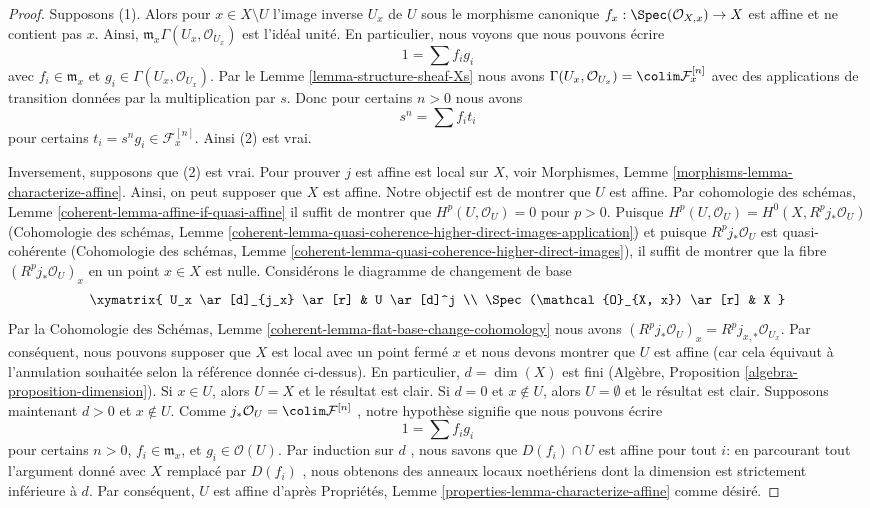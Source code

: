 \begin{proof}
Supposons (1). Alors pour  $x \in X \setminus U$  l'image inverse  $U_x$  de
 $U$  sous le morphisme canonique  $f_x : \Spec(\mathcal{O}_{X, x}) \to X$  est affine et ne contient
pas  $x$. Ainsi,  $\mathfrak m_x \Gamma(U_x, \mathcal{O}_{U_x})$  est l'idéal unité. En particulier, nous
voyons que nous pouvons écrire
$$
1 = \sum f_i g_i
$$
avec  $f_i \in \mathfrak m_x$  et  $g_i \in \Gamma(U_x, \mathcal{O}_{U_x})$. Par le Lemme  \ref{lemma-structure-sheaf-Xs}  nous avons
 $\Gamma(U_x, \mathcal{O}_{U_x}) = \colim \mathcal{F}^{[n]}_x$  avec des applications de transition données par la multiplication par
 $s$. Donc pour certains  $n > 0$  nous avons
$$
s^n = \sum f_i t_i
$$
pour certains  $t_i = s^ng_i \in \mathcal{F}^{[n]}_x$. Ainsi (2) est vrai.

\medskip\noindent
Inversement, supposons que (2) est vrai. Pour prouver  $j$  est affine est
local sur  $X$, voir Morphismes, Lemme  \ref{morphisms-lemma-characterize-affine}. Ainsi, on peut
supposer que  $X$  est affine. Notre objectif est de montrer que
 $U$  est affine. Par cohomologie des schémas, Lemme  \ref{coherent-lemma-affine-if-quasi-affine}  il suffit
de montrer que  $H^p(U, \mathcal{O}_U) = 0$  pour  $p > 0$. Puisque  $H^p(U, \mathcal{O}_U) = H^0(X, R^pj_*\mathcal{O}_U)$  (Cohomologie
des schémas, Lemme  \ref{coherent-lemma-quasi-coherence-higher-direct-images-application}) et puisque  $R^pj_*\mathcal{O}_U$  est quasi-cohérente
(Cohomologie des schémas, Lemme  \ref{coherent-lemma-quasi-coherence-higher-direct-images}), il suffit de montrer que la fibre
 $(R^pj_*\mathcal{O}_U)_x$  en un point  $x \in X$  est nulle. Considérons le diagramme de
changement de base
$$
\xymatrix{
U_x \ar[d]_{j_x} \ar[r] & U \ar[d]^j \\
\Spec(\mathcal{O}_{X, x}) \ar[r] & X
}
$$
Par la Cohomologie des Schémas, Lemme  \ref{coherent-lemma-flat-base-change-cohomology}  nous avons  $(R^pj_*\mathcal{O}_U)_x = R^pj_{x, *}\mathcal{O}_{U_x}$. Par
conséquent, nous pouvons supposer que  $X$  est local avec un point fermé
 $x$  et nous devons montrer que  $U$  est affine (car cela équivaut
à l'annulation souhaitée selon la référence donnée ci-dessus). En particulier,
 $d = \dim(X)$  est fini (Algèbre, Proposition  \ref{algebra-proposition-dimension}). Si  $x \in U$, alors
 $U = X$  et le résultat est clair. Si  $d = 0$  et  $x \not \in U$, alors
 $U = \emptyset$  et le résultat est clair. Supposons maintenant  $d > 0$  et
 $x \not \in U$. Comme  $j_*\mathcal{O}_U = \colim \mathcal{F}^{[n]}$ , notre hypothèse signifie que nous pouvons écrire
$$
1 = \sum f_i g_i
$$
pour certains  $n > 0$,  $f_i \in \mathfrak m_x$, et  $g_i \in \mathcal{O}(U)$. Par induction sur
 $d$ , nous savons que  $D(f_i) \cap U$  est affine pour tout  $i$: en
parcourant tout l'argument donné avec  $X$  remplacé par  $D(f_i)$ , nous
obtenons des anneaux locaux noethériens dont la dimension est strictement
inférieure à  $d$. Par conséquent,  $U$  est affine d'après
Propriétés, Lemme  \ref{properties-lemma-characterize-affine}  comme désiré.
\end{proof}





